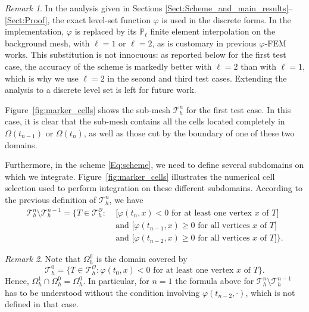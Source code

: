 \documentclass[11pt,a4paper]{article}
\theoremstyle{plain}
\theoremstyle{definition}
\theoremstyle{remark}
\newtheorem{remark}{Remark}%
\numberwithin{equation}{section}
\begin{document}
\begin{remark}
In the analysis given in Sections \ref{Sect:Scheme_and_main_results}--\ref{Sect:Proof}, the exact level-set function $\varphi$ is used in the discrete forms. In the implementation, $\varphi$ is replaced by its $\mathbb{P}_\ell$ finite element interpolation on the background mesh, with $\ell=1$ or $\ell=2$, as is customary in previous $\varphi$-FEM works. This substitution is not innocuous: as reported below for the first test case, the accuracy of the scheme is markedly better with $\ell=2$ than with $\ell=1$, which is why we use $\ell=2$ in the second and third test cases. Extending the analysis to a discrete level set is left for future work.
\end{remark}

Figure~\ref{fig:marker_cells} shows the sub-mesh $\mathcal{T}_h^n$ for the first test case. In this case, it is clear that the sub-mesh contains all the cells located completely in $\Omega(t_{n-1})$ or $\Omega(t_n)$, as well as those cut by the boundary of one of these two domains.

\noindent Furthermore, in the scheme \eqref{Eq:scheme}, we need to define several subdomains on which we integrate. Figure~\ref{fig:marker_cells} illustrates the numerical cell selection used to perform integration on these different subdomains. According to the previous definition of $\mathcal{T}_h^n$, we have
\begin{align*}
    \mathcal{T}_h^n \setminus \mathcal{T}_h^{n-1} = \biggl\{ T \in \mathcal{T}_h^\mathcal{O} : &\; \biggl[ \varphi(t_n, x) < 0 \text{ for at least one vertex } x \text{ of } T \biggr] \\
    &\; \text{and } \biggl[ \varphi(t_{n-1}, x) \geq 0 \text{ for all vertices } x \text{ of } T \biggr] \\
    &\; \text{and } \biggl[ \varphi(t_{n-2}, x) \geq 0 \text{ for all vertices } x \text{ of } T \biggr] \biggr\}.
\end{align*}

\begin{remark}
Note that $\Omega_h^0$ is the domain covered by
\[ \mathcal{T}_h^0 = \{ T \in \mathcal{T}_h^\mathcal{O} : \varphi(t_0, x) < 0 \text{ for at least one vertex } x \text{ of } T \}. \]
Hence, $\Omega_h^1 \cap \Omega_h^0 = \Omega_h^0$. In particular, for $n=1$ the formula above for $\mathcal{T}_h^n\setminus\mathcal{T}_h^{n-1}$ has to be understood without the condition involving $\varphi(t_{n-2},\cdot)$, which is not defined in that case.
\end{remark}
\end{document}

